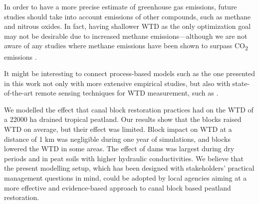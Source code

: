 \documentclass[bg, manuscript]{copernicus}
\begin{document}
In order to have a more precise estimate of greenhouse gas emissions, future studies should take into account emissions of other compounds, such as methane and nitrous oxides.
In fact, having shallower WTD as the only optimization goal may not be desirable due to increased methane emissions---although we are not aware of any studies where methane emissions have been shown to surpass CO\textsubscript{2} emissions \citep{tehSeasonalVariabilityMethane2017, wongMicrometeorologicalMeasurementMethane2018, planas-clarkeEffectWaterTable2020, deshmukhImpactForestPlantation2020, deshmukhConservationSlowsEmission2021, kiuruPeatMacroporeNetworks2022, zouRewettingGlobalWetlands2022, lestariRewettingTropicalPeatlands2022}.

It might be interesting to connect process-based models such as the one presented in this work not only with more extensive empirical studies, but also with state-of-the-art remote sensing techniques for WTD measurement, such as \cite{hikouei2023}.

\conclusions  %
We modelled the effect that canal block restoration practices had on the WTD of a 22000 \unit{ha} drained tropical peatland.
Our results show that the blocks raised WTD on average, but their effect was limited.
Block impact on WTD at a distance of 1 \unit{km} was negligible during one year of simulations, and blocks lowered the WTD in some  areas.
The effect of dams was largest during dry periods and in peat soils with higher hydraulic conductivities.
We believe that the present modelling setup, which has been designed with stakeholders' practical management questions in mind, could be adopted by local agencies aiming at a more effective and evidence-based approach to canal block based peatland restoration.





\end{document}
